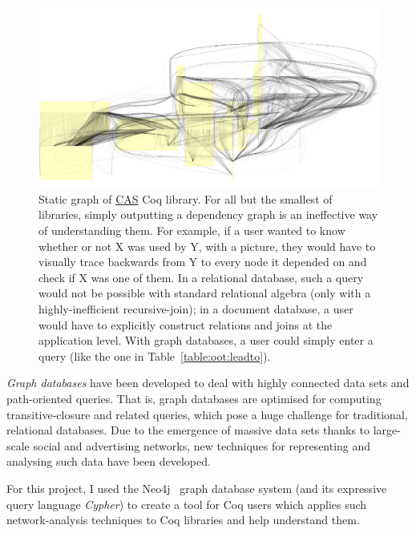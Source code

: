 \begin{figure}[t]

  \centering
  \includegraphics[width=\textwidth, page=1]{img/static-CAS-small.pdf}

  \caption{Static graph of \href{https://github.com/Timothy-G-Griffin/CAS}{CAS}
    Coq library. For all but the smallest of libraries, simply outputting a
    dependency graph is an ineffective way of understanding them. For example,
    if a user wanted to know whether or not X was used by Y, with a picture,
    they would have to visually trace backwards from Y to every node it depended
    on and check if X was one of them. In a relational database, such a query
    would not be possible with standard relational algebra (only with a
    highly-inefficient recursive-join); in a document database, a user would
    have to explicitly construct relations and joins at the application level.
    With graph databases, a user could simply enter a query (like the one in
    Table~\ref{table:oot:leadto}).}\label{fig:static}

\end{figure}

\emph{Graph databases} have been developed to deal with highly connected data
sets and path-oriented queries. That is, graph databases are optimised for
computing transitive-closure and related queries, which pose a huge challenge
for traditional, relational databases. Due to the emergence of massive data
sets thanks to large-scale social and advertising networks, new techniques for
representing and analysing such data have been developed.

For this project, I used the Neo4j~{\citep{neo4j}} graph database system (and its
expressive query language \emph{Cypher}) to create a tool for Coq users which
applies such network-analysis techniques to Coq libraries and help understand
them.

